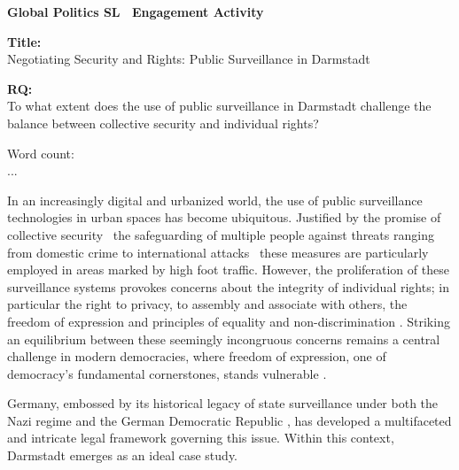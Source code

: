 \documentclass[12pt]{article}
\begin{document}
	
	\begin{titlepage}
		\centering
		
		\textbf{Global Politics SL \textemdash\ Engagement Activity}
		
		\vspace*{4cm}
		
		\textbf{Title:}\\
		Negotiating Security and Rights: Public Surveillance in Darmstadt
		
		\vspace{1cm}
		
		\textbf{RQ:}\\
		To what extent does the use of public surveillance in Darmstadt challenge the balance between collective security and individual rights?
		
		\vspace{4cm}
		
		Word count:\\
		...
		
		\vfill
	\end{titlepage}
	
	
	In an increasingly digital and urbanized world, the use of public surveillance technologies in urban spaces has become ubiquitous. Justified by the promise of collective security \textemdash\ the safeguarding of multiple people against threats ranging from domestic crime to international attacks \parencites{noauthor_security_2025}{noauthor_collective_2025} \textemdash\ these measures are particularly employed in areas marked by high foot traffic. However, the proliferation of these surveillance systems provokes concerns about the integrity of individual rights; in particular the right to privacy, to assembly and associate with others, the freedom of expression and principles of equality and non-discrimination \parencite{nandy2023}. Striking an equilibrium between these seemingly incongruous concerns remains a central challenge in modern democracies, where freedom of expression, one of democracy's fundamental cornerstones, stands vulnerable \parencite{noauthor_special_nodate}. 
		
	Germany, embossed by its historical legacy of state surveillance under both the Nazi regime \parencite{mdrde_uberwachung_nodate} and the German Democratic Republic \parencite{lichter_loeffler_siegloch2016}, has developed a multifaceted and intricate legal framework governing this issue. Within this context, Darmstadt emerges as an ideal case study.
	
\end{document}
